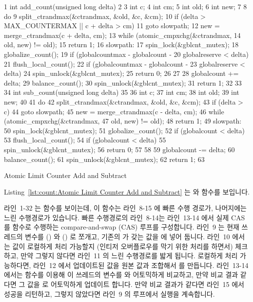 \begin{listing}[tbp]
{ \scriptsize
\begin{verbbox}
  1 int add_count(unsigned long delta)
  2 {
  3   int c;
  4   int cm;
  5   int old;
  6   int new;
  7 
  8   do {
  9     split_ctrandmax(&ctrandmax, &old, &c, &cm);
 10     if (delta > MAX_COUNTERMAX || c + delta > cm)
 11       goto slowpath;
 12     new = merge_ctrandmax(c + delta, cm);
 13   } while (atomic_cmpxchg(&ctrandmax,
 14                           old, new) != old);
 15   return 1;
 16 slowpath:
 17   spin_lock(&gblcnt_mutex);
 18   globalize_count();
 19   if (globalcountmax - globalcount -
 20       globalreserve < delta) {
 21     flush_local_count();
 22     if (globalcountmax - globalcount -
 23         globalreserve < delta) {
 24       spin_unlock(&gblcnt_mutex);
 25       return 0;
 26     }
 27   }
 28   globalcount += delta;
 29   balance_count();
 30   spin_unlock(&gblcnt_mutex);
 31   return 1;
 32 }
 33 
 34 int sub_count(unsigned long delta)
 35 {
 36   int c;
 37   int cm;
 38   int old;
 39   int new;
 40 
 41   do {
 42     split_ctrandmax(&ctrandmax, &old, &c, &cm);
 43     if (delta > c)
 44       goto slowpath;
 45     new = merge_ctrandmax(c - delta, cm);
 46   } while (atomic_cmpxchg(&ctrandmax,
 47                           old, new) != old);
 48   return 1;
 49 slowpath:
 50   spin_lock(&gblcnt_mutex);
 51   globalize_count();
 52   if (globalcount < delta) {
 53     flush_local_count();
 54     if (globalcount < delta) {
 55       spin_unlock(&gblcnt_mutex);
 56       return 0;
 57     }
 58   }
 59   globalcount -= delta;
 60   balance_count();
 61   spin_unlock(&gblcnt_mutex);
 62   return 1;
 63 }
\end{verbbox}
}
\centering
\theverbbox
\caption{Atomic Limit Counter Add and Subtract}
\label{lst:count:Atomic Limit Counter Add and Subtract}
\end{listing}

Listing~\ref{lst:count:Atomic Limit Counter Add and Subtract} 는
 와  함수를 보입니다.

라인~1-32 는  함수를 보이는데, 이 함수는 라인~8-15 에 빠른 수행
경로가, 나머지에는 느린 수행경로가 있습니다.
빠른 수행경로의 라인~8-14는 라인~13-14 에서 실제 CAS 를 
함수로 수행하는 compare-and-swap (CAS) 루프를 구성합니다.
라인~9 는 현재 쓰레드의  변수를  () 와
 () 로 쪼개고, 기존의  가 갖는 
값을  에 넣어 둡니다.
라인~10 에서는  값이 로컬하게 처리 가능할지 (인티저 오버플로우를 막기
위한 처리를 하면서) 체크하고, 만약 그렇지 않다면 라인~11 의 느린 수행경로를
밟게 됩니다.
로컬하게 처리 가능하다면, 라인~12 에서 업데이트된  값을 원본
 값과 조합해서  를 만듭니다.
라인~13-14 에서는  함수를 이용해 이 쓰레드의
 변수를  와 어토믹하게 비교하고, 만약 비교 결과 같다면 그
값을  로 어토믹하게 업데이트 합니다.
만약 비교 결과가 같다면 라인~15 에서 성공을 리턴하고, 그렇지 않았다면 라인~9 의
루프에서 실행을 계속합니다.
\iffalse

